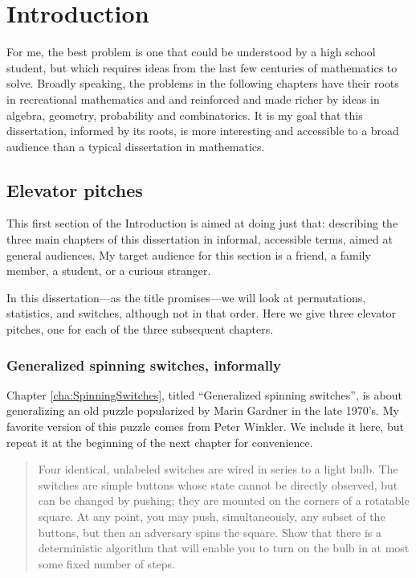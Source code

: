 \chapter{Introduction}
\label{cha:introduction}

For me, the best problem is one that could be understood by a high school
student, but which requires ideas from the last few centuries of mathematics to
solve. Broadly speaking, the problems in the following chapters have their
roots in recreational mathematics and and reinforced and made richer by ideas
in algebra, geometry, probability and combinatorics.
It is my goal that this dissertation, informed by its roots, is more interesting
and accessible to a broad audience than a typical dissertation in mathematics.

\section{Elevator pitches}

This first section of the Introduction is aimed at doing just that:
describing the three main chapters of this dissertation in informal, accessible
terms, aimed at general audiences.
My target audience for this section is a friend, a family member,
a student, or a curious stranger.

In this dissertation---as the title promises---we will look at
permutations, sta\-tis\-tics, and switch\-es, although not in that order. Here
we give three elevator pitches, one for each of the three subsequent chapters.

\subsection{Generalized spinning switches, informally}

Chapter \ref{cha:SpinningSwitches}, titled ``Generalized spinning switches'',
is about generalizing an old puzzle popularized by Marin Gardner in the late
1970's. My favorite version of this puzzle comes from Peter Winkler.
We include it here, but repeat it at the beginning of the next chapter for
convenience.

\begin{quote}
  Four identical, unlabeled switches are wired in series to a light bulb.
  The switches are simple buttons whose state cannot be directly observed,
  but can be changed by pushing; they are mounted on the corners of a
  rotatable square. At any point, you may push, simultaneously, any subset
  of the buttons, but then an adversary spins the square. Show that there
  is a deterministic algorithm that will enable you to turn on the bulb in
  at most some fixed number of steps. \cite{Winkler2004}
\end{quote}


